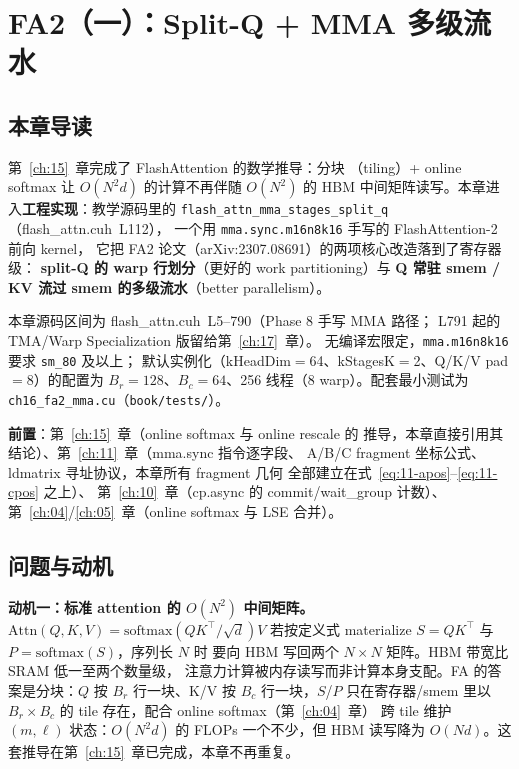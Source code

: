 \providecommand{\url}[1]{\texttt{#1}}
\chapter{FA2（一）：Split-Q + MMA 多级流水}\label{ch:16}

\section{本章导读}

第~\ref{ch:15}~章完成了 FlashAttention 的数学推导：分块
（tiling）+ online softmax 让 $O(N^2 d)$ 的计算不再伴随 $O(N^2)$ 的
HBM 中间矩阵读写。本章进入\textbf{工程实现}：教学源码里的
\texttt{flash\_\allowbreak{}attn\_\allowbreak{}mma\_\allowbreak{}stages\_\allowbreak{}split\_\allowbreak{}q}（flash\_attn.cuh~L112），
一个用 \texttt{mma.\allowbreak{}sync.\allowbreak{}m16n8k16} 手写的 FlashAttention-2 前向 kernel，
它把 FA2 论文（arXiv:2307.08691）的两项核心改造落到了寄存器级：
\textbf{split-Q 的 warp 行划分}（更好的 work partitioning）与
\textbf{Q 常驻 smem / KV 流过 smem 的多级流水}（better parallelism）。

本章源码区间为 flash\_attn.cuh~L5--790（Phase 8 手写 MMA 路径；
L791 起的 TMA/Warp Specialization 版留给第~\ref{ch:17}~章）。
无编译宏限定，\texttt{mma.\allowbreak{}m16n8k16} 要求 \texttt{sm\_80} 及以上；
默认实例化（kHeadDim$=$64、kStagesK$=$2、Q/K/V pad$=$8）的配置为
$B_r{=}128$、$B_c{=}64$、256 线程（8 warp）。配套最小测试为
\texttt{ch16\_\allowbreak{}fa2\_\allowbreak{}mma.\allowbreak{}cu}（\texttt{book/tests/}）。

\textbf{前置}：第~\ref{ch:15}~章（online softmax 与 online rescale 的
推导，本章直接引用其结论）、第~\ref{ch:11}~章（mma.sync 指令逐字段、
A/B/C fragment 坐标公式、ldmatrix 寻址协议，本章所有 fragment 几何
全部建立在式~\ref{eq:11-apos}--\ref{eq:11-cpos} 之上）、
第~\ref{ch:10}~章（cp.async 的 commit/wait\_group 计数）、
第~\ref{ch:04}/\ref{ch:05}~章（online softmax 与 LSE 合并）。

\section{问题与动机}

\textbf{动机一：标准 attention 的 $O(N^2)$ 中间矩阵。}
$\mathrm{Attn}(Q,K,V)=\mathrm{softmax}(QK^\top/\sqrt{d})V$ 若按定义式
materialize $S=QK^\top$ 与 $P=\mathrm{softmax}(S)$，序列长 $N$ 时
要向 HBM 写回两个 $N\times N$ 矩阵。HBM 带宽比 SRAM 低一至两个数量级，
注意力计算被内存读写而非计算本身支配。FA 的答案是分块：$Q$ 按
$B_r$ 行一块、K/V 按 $B_c$ 行一块，$S$/$P$ 只在寄存器/smem 里以
$B_r\times B_c$ 的 tile 存在，配合 online softmax（第~\ref{ch:04}~章）
跨 tile 维护 $(m,\ell)$ 状态：$O(N^2 d)$ 的 FLOPs 一个不少，但 HBM
读写降为 $O(Nd)$。这套推导在第~\ref{ch:15}~章已完成，本章不再重复。

